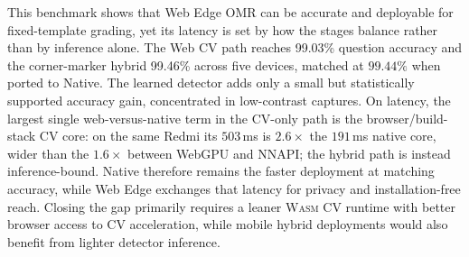 \documentclass[conference]{IEEEtran}
\newcommand{\wasm}{\textnormal{\textsc{Wasm}}}
\begin{document}
This benchmark shows that Web Edge OMR can be accurate and deployable for
fixed-template grading, yet its latency is set by how the stages balance rather
than by inference alone. The Web CV path reaches 99.03\% question accuracy and the corner-marker
hybrid 99.46\% across five devices, matched at $99.44\%$ when ported to Native.
The learned detector adds only a small but statistically supported accuracy
gain, concentrated in low-contrast captures. On latency, the largest single web-versus-native term in the CV-only path is the
browser/build-stack CV core: on the same Redmi its $503$\,ms is $2.6\times$ the
$191$\,ms native core, wider than the $1.6\times$ between WebGPU and NNAPI; the
hybrid path is instead inference-bound. Native therefore
remains the faster deployment at matching accuracy, while Web Edge exchanges
that latency for privacy and installation-free reach. Closing the gap primarily requires a leaner \wasm{} CV runtime with better browser access to CV acceleration, while mobile hybrid deployments would also benefit from lighter detector inference.
\end{document}
